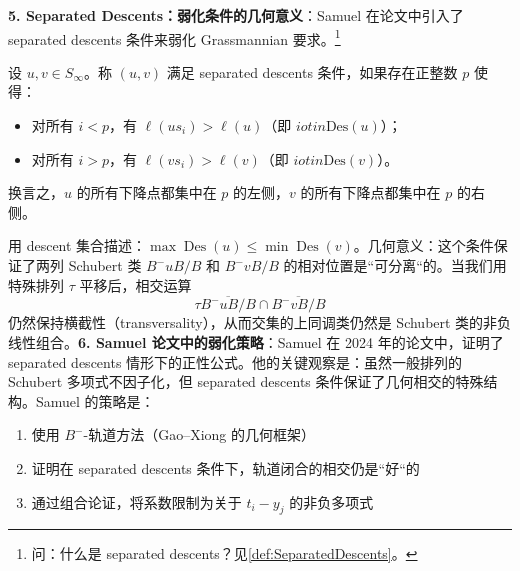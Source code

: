 \textbf{5. Separated Descents：弱化条件的几何意义}：Samuel 在论文中引入了 separated descents 条件来弱化 Grassmannian 要求。\footnote{问：什么是 separated descents？见\cref{def:SeparatedDescents}。}
\begin{Definition}设 $u, v \in S_\infty$。称 $(u, v)$ 满足 separated descents 条件，如果存在正整数 $p$ 使得：
\begin{itemize}
\item 对所有 $i < p$，有 $\ell(us_i) > \ell(u)$（即 $i otin \mathrm{Des}(u)$）；
\item 对所有 $i > p$，有 $\ell(vs_i) > \ell(v)$（即 $i otin \mathrm{Des}(v)$）。
\end{itemize}换言之，$u$ 的所有下降点都集中在 $p$ 的左侧，$v$ 的所有下降点都集中在 $p$ 的右侧。
\end{Definition}用 descent 集合描述：$\max \operatorname{Des}(u) \leq \min \operatorname{Des}(v)$。几何意义：这个条件保证了两列 Schubert 类 $B^-uB/B$ 和 $B^-vB/B$ 的相对位置是``可分离``的。当我们用特殊排列 $\tau$ 平移后，相交运算$$\tau \overline{B^-uB/B} \cap \overline{B^-vB/B}$$仍然保持横截性（transversality），从而交集的上同调类仍然是 Schubert 类的非负线性组合。\textbf{6. Samuel 论文中的弱化策略}：Samuel 在 2024 年的论文中，证明了 separated descents 情形下的正性公式。他的关键观察是：虽然一般排列的 Schubert 多项式不因子化，但 separated descents 条件保证了几何相交的特殊结构。Samuel 的策略是：
\begin{enumerate}
\item 使用 $B^-$-轨道方法（Gao--Xiong \cite{GX2025} 的几何框架）
\item 证明在 separated descents 条件下，轨道闭合的相交仍是``好``的
\item 通过组合论证，将系数限制为关于 $t_i - y_j$ 的非负多项式
\end{enumerate}

